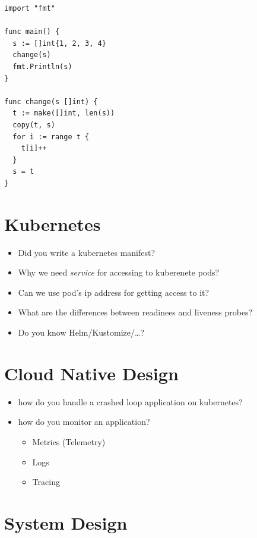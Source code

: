 \documentclass[]{article}
\begin{document}
\begin{multicols}{2}
\begin{itemize}
\begin{verbatim}
import "fmt"

func main() {
  s := []int{1, 2, 3, 4}
  change(s)
  fmt.Println(s)
}

func change(s []int) {
  t := make([]int, len(s))
  copy(t, s)
  for i := range t {
    t[i]++
  }
  s = t
}
      \end{verbatim}

  \end{itemize}

  \section{Kubernetes}

  \begin{itemize}
    \item Did you write a kubernetes manifest?
    \item Why we need \textit{service} for accessing to kuberenete pods?
    \item Can we use pod's ip address for getting access to it?
    \item What are the differences between readinees and liveness probes?
    \item Do you know Helm/Kustomize/\ldots?
  \end{itemize}

  \section{Cloud Native Design}

  \begin{itemize}
    \item how do you handle a crashed loop application on kubernetes?
    \item how do you monitor an application?
      \begin{itemize}
        \item Metrics (Telemetry)
        \item Logs
        \item Tracing
      \end{itemize}
  \end{itemize}

  \section{System Design}


\end{multicols}
\end{document}
